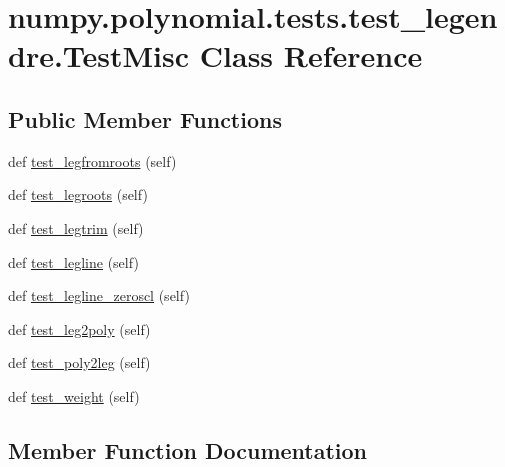 \hypertarget{classnumpy_1_1polynomial_1_1tests_1_1test__legendre_1_1TestMisc}{}\section{numpy.\+polynomial.\+tests.\+test\+\_\+legendre.\+Test\+Misc Class Reference}
\label{classnumpy_1_1polynomial_1_1tests_1_1test__legendre_1_1TestMisc}
\subsection*{Public Member Functions}
\begin{DoxyCompactItemize}
\item 
def \hyperlink{classnumpy_1_1polynomial_1_1tests_1_1test__legendre_1_1TestMisc_a8dc18b7733064d92cfaba61fb172e03b}{test\+\_\+legfromroots} (self)
\item 
def \hyperlink{classnumpy_1_1polynomial_1_1tests_1_1test__legendre_1_1TestMisc_accc001c0e3cc355a63c24aa0267126bb}{test\+\_\+legroots} (self)
\item 
def \hyperlink{classnumpy_1_1polynomial_1_1tests_1_1test__legendre_1_1TestMisc_ac8fee1ef883bc06f52e782087b7c70df}{test\+\_\+legtrim} (self)
\item 
def \hyperlink{classnumpy_1_1polynomial_1_1tests_1_1test__legendre_1_1TestMisc_a93afc52f2cb861490db6d05a90b1de20}{test\+\_\+legline} (self)
\item 
def \hyperlink{classnumpy_1_1polynomial_1_1tests_1_1test__legendre_1_1TestMisc_a73aa6689044deefc69ef2df57569961e}{test\+\_\+legline\+\_\+zeroscl} (self)
\item 
def \hyperlink{classnumpy_1_1polynomial_1_1tests_1_1test__legendre_1_1TestMisc_a6d246e4b939881d90e57b21b413f7f9e}{test\+\_\+leg2poly} (self)
\item 
def \hyperlink{classnumpy_1_1polynomial_1_1tests_1_1test__legendre_1_1TestMisc_a2048f97511f5121c686edd04016bd6ec}{test\+\_\+poly2leg} (self)
\item 
def \hyperlink{classnumpy_1_1polynomial_1_1tests_1_1test__legendre_1_1TestMisc_a6f210f45caffaf40777b14e28db06634}{test\+\_\+weight} (self)
\end{DoxyCompactItemize}


\subsection{Member Function Documentation}
\mbox{\label{classnumpy_1_1polynomial_1_1tests_1_1test__legendre_1_1TestMisc_a6d246e4b939881d90e57b21b413f7f9e}} 

